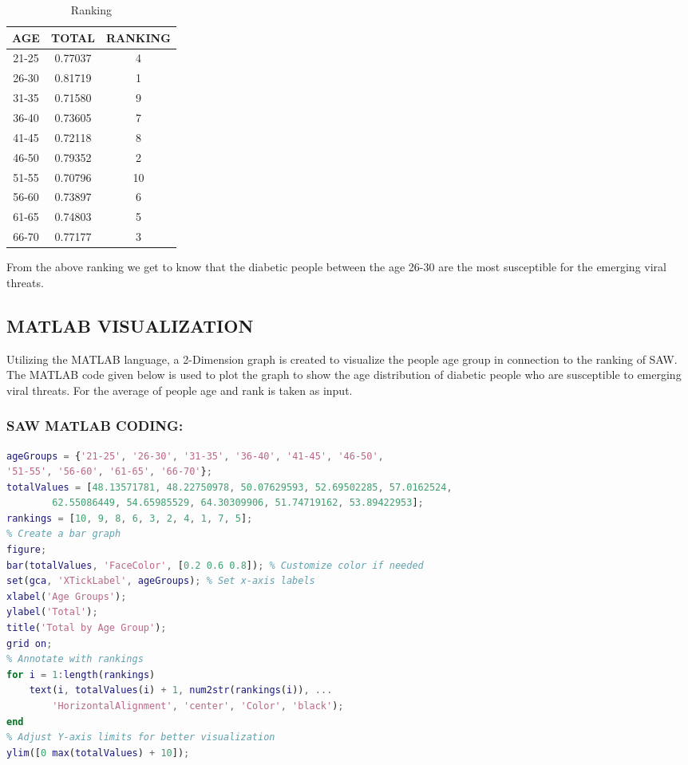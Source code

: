 \documentclass[12pt,a4paper]{article}
\begin{document}
\begin{itemize}
\begin{table}[h]
\centering
\begin{tabular}{|c|c|c|}
\hline
\textbf{AGE} & \textbf{TOTAL} & \textbf{RANKING} \\
\hline
21-25  & 0.77037  & 4  \\
26-30  & 0.81719  & 1  \\
31-35  & 0.71580  & 9  \\
36-40  & 0.73605  & 7  \\
41-45  & 0.72118  & 8  \\
46-50  & 0.79352  & 2  \\
51-55  & 0.70796  & 10 \\
56-60  & 0.73897  & 6  \\
61-65  & 0.74803  & 5  \\
66-70  & 0.77177  & 3  \\
\hline
\end{tabular}
\caption{Ranking}
\end{table}

From the above ranking we get to know that the diabetic people between the age 26-30 are the most susceptible for the emerging viral threats.

\end{itemize}
\newpage
\subsection{MATLAB VISUALIZATION }

Utilizing the MATLAB language, a 2-Dimension graph is created to visualize the people age group in connection to the ranking of SAW. The MATLAB code given below is used to plot the graph to show the age distribution of diabetic people who are susceptible to emerging viral threats. For the average of people age and rank is taken as input. 
\subsubsection{SAW MATLAB CODING:}

\begin{lstlisting}[language= MATLAB]
% Data
ageGroups = {'21-25', '26-30', '31-35', '36-40', '41-45', '46-50', 
'51-55', '56-60', '61-65', '66-70'};
totalValues = [48.13571781, 48.22750978, 50.07629593, 52.69502285, 57.0162524, 
        62.55086449, 54.65985529, 64.30309906, 51.74719162, 53.89422953];
rankings = [10, 9, 8, 6, 3, 2, 4, 1, 7, 5];
% Create a bar graph
figure;
bar(totalValues, 'FaceColor', [0.2 0.6 0.8]); % Customize color if needed
set(gca, 'XTickLabel', ageGroups); % Set x-axis labels
xlabel('Age Groups');
ylabel('Total');
title('Total by Age Group');
grid on;
% Annotate with rankings
for i = 1:length(rankings)
    text(i, totalValues(i) + 1, num2str(rankings(i)), ...
        'HorizontalAlignment', 'center', 'Color', 'black');
end
% Adjust Y-axis limits for better visualization
ylim([0 max(totalValues) + 10]);
\end{lstlisting}
\end{document}

